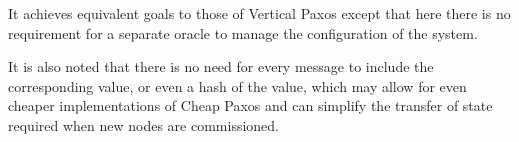 \documentclass[journal]{IEEEtran}
\begin{document}
It achieves equivalent goals to those of Vertical Paxos\cite{vertical-paxos}
except that here there is no requirement for a separate oracle to manage the
configuration of the system.

It is also noted that there is no need for every message to include the
corresponding value, or even a hash of the value, which may allow for even
cheaper implementations of Cheap Paxos\cite{cheap-paxos} and can simplify the
transfer of state\cite{vertical-paxos} required when new nodes are
commissioned.

%
%




%
%
\end{document}
